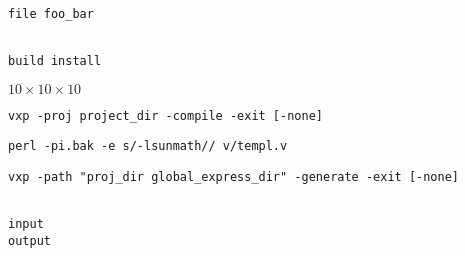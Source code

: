 {\newpage\clearpage
{}%
\begin{display}\begin{verbatim}

file foo_bar\end{verbatim}
\end{display}%
\lthtmlfigureZ
\lthtmlcheckvsize\clearpage}

{\newpage\clearpage
{}%
\begin{display}\begin{verbatim}

build install\end{verbatim}
\end{display}%
\lthtmlfigureZ
\lthtmlcheckvsize\clearpage}

{\newpage\clearpage
{}%
$10\times10\times10$%
\lthtmlinlinemathZ
\lthtmlcheckvsize\clearpage}

{\newpage\clearpage
{}%
\begin{display}\begin{verbatim}
vxp -proj project_dir -compile -exit [-none]\end{verbatim}
\end{display}%
\lthtmlfigureZ
\lthtmlcheckvsize\clearpage}

{\newpage\clearpage
{}%
\begin{display}\begin{verbatim}
perl -pi.bak -e s/-lsunmath// v/templ.v\end{verbatim}
\end{display}%
\lthtmlfigureZ
\lthtmlcheckvsize\clearpage}

{\newpage\clearpage
{}%
\begin{display}\begin{verbatim}
vxp -path "proj_dir global_express_dir" -generate -exit [-none]\end{verbatim}
\end{display}%
\lthtmlfigureZ
\lthtmlcheckvsize\clearpage}

{\newpage\clearpage
{}%
\begin{display}\begin{verbatim}

input
output\end{verbatim}
\end{display}%
\lthtmlfigureZ
\lthtmlcheckvsize\clearpage}

